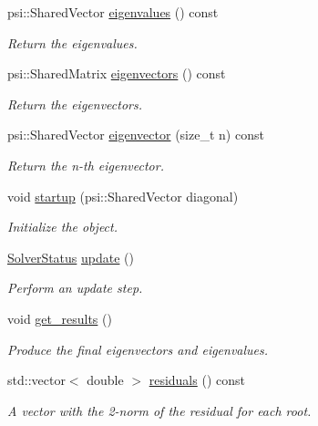 \begin{DoxyCompactItemize}
psi\+::\+Shared\+Vector \mbox{\hyperlink{classforte_1_1_davidson_liu_solver_ac35bcdec2a59ab95da00f27453bfb0fe}{eigenvalues}} () const
\begin{DoxyCompactList}\small\item\em Return the eigenvalues. \end{DoxyCompactList}\item 
psi\+::\+Shared\+Matrix \mbox{\hyperlink{classforte_1_1_davidson_liu_solver_a29270144e1b206b5a0cd34875b733566}{eigenvectors}} () const
\begin{DoxyCompactList}\small\item\em Return the eigenvectors. \end{DoxyCompactList}\item 
psi\+::\+Shared\+Vector \mbox{\hyperlink{classforte_1_1_davidson_liu_solver_a447794af9fa43098ae49a0e338006c88}{eigenvector}} (size\+\_\+t n) const
\begin{DoxyCompactList}\small\item\em Return the n-\/th eigenvector. \end{DoxyCompactList}\item 
void \mbox{\hyperlink{classforte_1_1_davidson_liu_solver_a5ea48ce184951d29d39e710ef1a4dc4b}{startup}} (psi\+::\+Shared\+Vector diagonal)
\begin{DoxyCompactList}\small\item\em Initialize the object. \end{DoxyCompactList}\item 
\mbox{\hyperlink{namespaceforte_a62f3fc3a26f13fb59a89be14ecc8fa07}{Solver\+Status}} \mbox{\hyperlink{classforte_1_1_davidson_liu_solver_a332c9bab147d3a895caf073950e30dd1}{update}} ()
\begin{DoxyCompactList}\small\item\em Perform an update step. \end{DoxyCompactList}\item 
void \mbox{\hyperlink{classforte_1_1_davidson_liu_solver_ad34514120b781b92c88d6f160d973cb8}{get\+\_\+results}} ()
\begin{DoxyCompactList}\small\item\em Produce the final eigenvectors and eigenvalues. \end{DoxyCompactList}\item 
std\+::vector$<$ double $>$ \mbox{\hyperlink{classforte_1_1_davidson_liu_solver_aa404bd3a84b3eaaf41af45accaad1a67}{residuals}} () const
\begin{DoxyCompactList}\small\item\em A vector with the 2-\/norm of the residual for each root. \end{DoxyCompactList}\end{DoxyCompactItemize}


